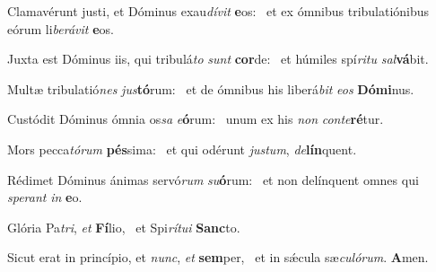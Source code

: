 \item Clamavérunt justi, et Dóminus exau\textit{dívit} \textbf{e}os:~\psstar{} et ex ómnibus tribulatiónibus eórum li\textit{berávit} \textbf{e}os.
\item Juxta est Dóminus iis, qui tribulá\textit{to} \textit{sunt} \textbf{cor}de:~\psstar{} et húmiles spí\textit{ritu} \textit{sal}\textbf{vá}bit.
\item Multæ tribulatió\textit{nes} \textit{jus}\textbf{tó}\-rum:~\psstar{} et de ómnibus his liberá\textit{bit} \textit{eos} \textbf{Dó}\textbf{mi}nus.
\item Custódit Dóminus ómnia os\textit{sa} \textit{e}\textbf{ó}rum:~\psstar{} unum ex his \textit{non} \textit{conte}\textbf{ré}tur.
\item Mors pecca\textit{tórum} \textbf{pés}sima:~\psstar{} et qui odérunt \textit{justum}, \textit{de}\textbf{lín}quent.
\item Rédimet Dóminus ánimas servó\textit{rum} \textit{su}\textbf{ó}rum:~\psstar{} et non delínquent omnes qui \textit{sperant} \textit{in} \textbf{e}o.
\item Glória Pa\textit{tri}, \textit{et} \textbf{Fí}lio,~\psstar{} et Spi\textit{rítui} \textbf{Sanc}to.
\item Sicut erat in princípio, et \textit{nunc}, \textit{et} \textbf{sem}per,~\psstar{} et in sǽcula sæ\textit{culórum}. \textbf{A}men.
